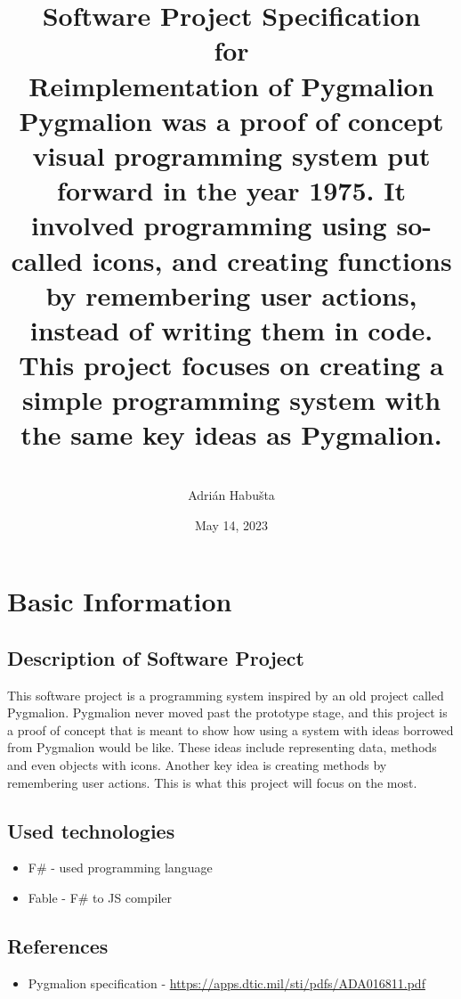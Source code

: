 \documentclass{article}
\author{%
    \vspace{3.5mm}\currentversion\\
    Adrián Habušta
    }
\title{%
    \LARGE Software Project Specification \\
    \Large for \\
    \Huge Reimplementation of Pygmalion \\\vspace{10mm}
    \normalsize Pygmalion was a proof of concept visual programming system
    put forward in the year 1975. It involved programming using so-called
    icons, and creating functions by remembering user actions, instead of
    writing them in code. This project focuses on creating a simple programming
    system with the same key ideas as Pygmalion.
    }
\date{May 14, 2023}
\begin{document}
    \begin{titlepage}
        \maketitle
    \end{titlepage}

    \tableofcontents
    \newpage

    \section{Basic Information}
        \subsection{Description of Software Project}
            This software project is a programming system inspired by an old project called Pygmalion.
            Pygmalion never moved past the prototype stage, and this project is a proof of concept that is meant
            to show how using a system with ideas borrowed from Pygmalion would be like. These ideas include
            representing data, methods and even objects with icons. Another key idea is creating methods by remembering
            user actions. This is what this project will focus on the most.

        \subsection{Used technologies}
            \begin{itemize}
                \item
                    F\# - used programming language
                \item
                    Fable - F\# to JS compiler

            \end{itemize}

        \subsection{References}
            \begin{itemize}

                \item
                    Pygmalion specification
                    \subitem
                        - \url{https://apps.dtic.mil/sti/pdfs/ADA016811.pdf}

            \end{itemize}
\end{document}
